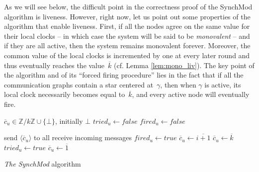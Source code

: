\documentclass{article}
\newcommand{\cent}{\gamma}
\begin{document}
As we will see below, the difficult point in the correctness proof of the SynchMod algorithm is liveness.
However, right now, let us point out some properties of the algorithm that enable liveness.
First, if all the nodes  agree on the same value for their local clocks 
	-- in which case the system will be said to be \emph{monovalent} -- and if they are all active, 
	then the system remains monovalent forever.
Moreover, the common value of the local clocks is incremented by one at every later round and thus eventually 
	reaches the value~$\overline{k} $ (cf. Lemma \ref{lem:mono_liv}).
The key point of the algorithm and of its ``forced firing procedure'' lies in the fact that if all the communication graphs  
	contain a star centered at~$\cent$, then when  $\cent$ is active, its local clock necessarily becomes equal 
	to~$\overline{k}$, and every active node will eventually fire. 


\begin{algorithm}[htb]\label{algo:code}
\begin{distribalgo}[1]
\BLANK {}
	\STATE $\overline{c}_u \in \mathds{Z}/k\mathds{Z} \cup \{\bot\}$, initially $\bot$
	\STATE $tried_u \leftarrow false$
	\STATE $fired_u \leftarrow false$

\ENDINDENT \BLANK

	\STATE send $\langle \overline{c}_u \rangle$ to all 
	\STATE receive incoming messages
		\STATE $fired_u \leftarrow true$ \label{line:fire}
	\ENDIF
		\STATE $\overline{c}_u \leftarrow \overline{i+1} $ \label{line:agreed}
	\ELSE {}
		\STATE $\overline{c}_u \leftarrow \overline{k} $  \label{line:try}
		\STATE $tried_u \leftarrow true$   \label{line:try+1}%
		\ELSE
		\STATE $\overline{c}_u \leftarrow \overline{1} $ \label{line:tried}%
	  \ENDIF
	  \ENDIF
\ENDINDENT 

\caption{{\em The SynchMod} algorithm} \label{algo:R}
\end{distribalgo}

\end{algorithm}
\end{document}
